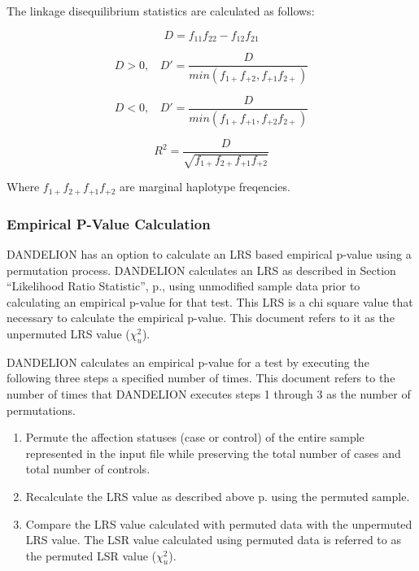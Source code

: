 \noindent{}The linkage disequilibrium statistics are calculated as follows:

\begin{equation*}
  D = f_{11}f_{22} - f_{12}f_{21}
\end{equation*}

\begin{equation*}
D>0,~~~~    D' = \frac{D}{min(f_{1+}f_{+2}, f_{+1}f_{2+})}
\end{equation*}

\begin{equation*}
D<0,~~~~   D' = \frac{D}{min(f_{1+}f_{+1}, f_{+2}f_{2+})}
\end{equation*}

\begin{equation*}
  R^2 = \frac{D}{\sqrt{f_{1+}f_{2+}f_{+1}f_{+2}}}
\end{equation*}

Where $f_{1+}f_{2+}f_{+1}f_{+2}$ are marginal haplotype freqencies.

\subsubsection{Empirical P-Value Calculation}
\label{subsec:emp_p_val}

DANDELION has an option to calculate an LRS based empirical p-value using a
permutation process.  DANDELION calculates an LRS as described in Section
``Likelihood Ratio Statistic'', p.\pageref{subsub:lrs}, using unmodified sample
data prior to calculating an empirical p-value for that test.  This LRS is a chi
square value that necessary to calculate the empirical p-value.  This document
refers to it as the unpermuted LRS value ($\chi^2_u$).

DANDELION calculates an empirical p-value for a test by executing the following
three steps a specified number of times.  This document refers to the number of
times that DANDELION executes steps 1 through 3 as the number of permutations.

\begin{enumerate}
\item Permute the affection statuses (case or control) of the entire sample
  represented in the input file while preserving the total number of cases and
  total number of controls.
\item Recalculate the LRS value as described above p.\pageref{subsub:lrs} using
  the permuted sample.
\item Compare the LRS value calculated with permuted data with the unpermuted
  LRS value.  The LSR value calculated using permuted data is referred to as the
  permuted LSR value ($\chi^2_u$).
\end{enumerate}

